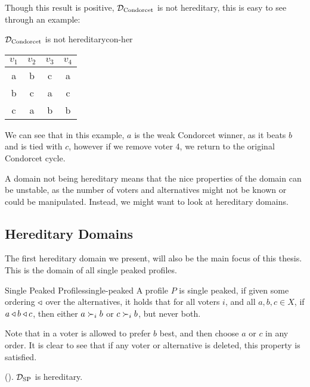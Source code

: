 Though this result is positive, $\mathcal{D}_{\textnormal{Condorcet}}$ is not hereditary, this is easy to see through an example:
\begin{example}{$\mathcal{D}_{\textnormal{Condorcet}}$ is not hereditary}{con-her}
	\begin{minipage}{0.25\linewidth}
		\begin{tabular}{cccc}
			\toprule
			$v_1$ & $v_2$ & $v_3$ & $v_4$ \\
			\midrule
			a     & b     & c     & a     \\
			b     & c     & a     & c     \\
			c     & a     & b     & b     \\
			\bottomrule
		\end{tabular}
	\end{minipage}
	\begin{minipage}[b]{0.70\linewidth}
		We can see that in this example, $a$ is the weak Condorcet winner, as it beats $b$ and is tied with $c$, however if we remove voter 4, we return to the original Condorcet cycle.
	\end{minipage}
\end{example}

A domain not being hereditary means that the nice properties of the domain can be unstable, as the number of voters and alternatives might not be known or could be manipulated. Instead, we might want to look at hereditary domains.

\subsection{Hereditary Domains}

The first hereditary domain we present, will also be the main focus of this thesis. This is the domain of all single peaked profiles.

\begin{definition}{Single Peaked Profiles}{single-peaked}
	A profile $P$ is single peaked, if given some ordering $\triangleleft$ over the alternatives, it holds that for all voters $i$, and all $a, b, c \in X$, if $a \triangleleft b \triangleleft c$, then either $a \succ_i b$ or $c \succ_i b$, but never both.
\end{definition}

Note that in  a voter is allowed to prefer $b$ best, and then choose $a$ or $c$ in any order. It is clear to see that if any voter or alternative is deleted, this property is satisfied.

\begin{proposition}{\textnormal{(\citet{elkindPreferenceRestrictionsComputational2022a}).}}
	$\mathcal{D}_{\textnormal{SP}}$ is hereditary.
\end{proposition}


